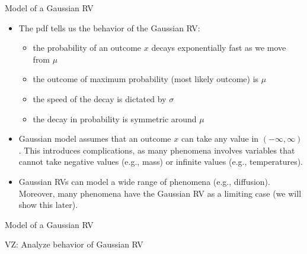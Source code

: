 \documentclass[9pt]{beamer}
\begin{document}
%
\begin{frame}{Model of a Gaussian RV}


\begin{itemize}
\item The pdf tells us the behavior of the Gaussian RV: 
\begin{itemize}
\item the probability of an outcome $x$ decays exponentially fast as we move from $\mu$
\item the outcome of maximum probability (most likely outcome) is $\mu$
\item the speed of the decay is dictated by $\sigma$
\item the decay in probability is symmetric around $\mu$
\end{itemize}

\item Gaussian model assumes that an outcome $x$ can take any value in $(-\infty,\infty)$. This introduces complications, as many phenomena involves variables that cannot take negative values (e.g., mass) or infinite values (e.g., temperatures).   

\item Gaussian RVs can model a wide range of phenomena (e.g., diffusion). Moreover, many phenomena have the Gaussian RV as a limiting case (we will show this later). 
\end{itemize}

\end{frame}

%
\begin{frame}{Model of a Gaussian RV}
\begin{block}{}
{\color{red} VZ: Analyze behavior of Gaussian RV}
\end{block}
\end{frame}
\end{document}
